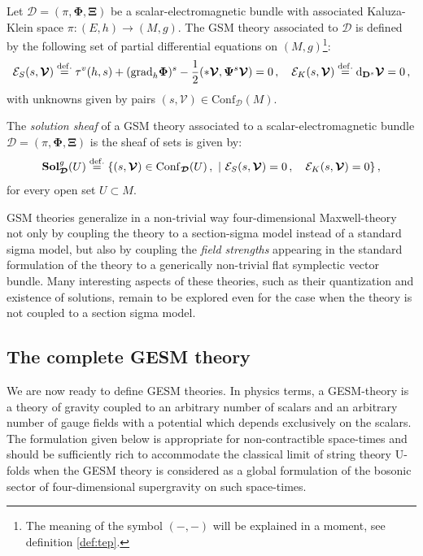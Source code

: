 \documentclass[10pt, cmp, numbook, final, a4paper]{svjour}
\newcommand{\eqdef}{\stackrel{{\rm def.}}{=}}
\def\bD{\mathbb{D}}
\def\dd{\mathrm{d}}
\def\bcD{\boldsymbol{\mathcal{D}}}
\def\bPsi{\mathbf{\Psi}}
\newcommand{\be}{\begin{equation*}}
\newcommand{\ee}{\end{equation*}}
\def\cE{\check{E}}
\def\bXi{{\boldsymbol{\Xi}}}
\def\cV{\mathcal{V}}
\def\cE{\mathcal{E}}
\def\bPhi{\mathbf{\Phi}}
\def\bSol{\mathbf{Sol}}
\def\grad{\mathrm{grad}}
\def\bD{\mathbf{D}}
\def\Conf{\mathrm{Conf}}
\def\bD{\mathbf{D}}
\def\bcV{\boldsymbol{\cV}}
\begin{document}
\begin{definition}
Let $\bcD = (\pi,\bPhi,\bXi)$ be a scalar-electromagnetic bundle with
associated Kaluza-Klein space $\pi\colon (E,h)\to (M,g)$. The
GSM theory associated to $\bcD$ is defined by the following set of
partial differential equations on $(M,g)$\footnote{The meaning of the
symbol $(-,-)$ will be explained in a moment, see definition \ref{def:tep}.}:
\begin{equation*}
\cE_{S}(s,\bcV) \eqdef \tau^{v}(h,s) + (\grad_{h} \bPhi)^{s}- \frac{1}{2} (\ast \bcV , \bPsi^s\bcV) = 0\, , \quad \cE_{K}(s,\bcV)\eqdef \dd_{\bD^s} \bcV=0\, ,
\end{equation*}
with unknowns given by pairs $(s,\bcV)\in \Conf_{\bcD}(M)$.
\end{definition}

\begin{definition}
The {\em solution sheaf} of a GSM theory associated to a
scalar-electromagnetic bundle $\bcD = (\pi,\bPhi,\bXi)$ is the sheaf
of sets is given by:
\be
\bSol^g_{\bcD}(U)\eqdef \{(s,\bcV)\in \Conf_{\bcD}(U)\, , \,\, |\,\, \cE_{S}(s,\bcV) = 0\, , \quad  \cE_{K}(s,\bcV) = 0\}\, ,
\ee
for every open set $U\subset M$.
\end{definition}

\noindent
GSM theories generalize in a non-trivial way four-dimensional
Maxwell-theory not only by coupling the theory to a section-sigma model
instead of a standard sigma model, but also by coupling
the \emph{field strengths} appearing in the standard formulation of
the theory to a generically non-trivial flat symplectic vector
bundle. Many interesting aspects of these theories, such as their
quantization and existence of solutions, remain to be explored
even for the case when the theory is not coupled to a section sigma
model. 

\subsection{The complete GESM theory}
\label{sec:completetheoryII}

We are now ready to define GESM theories. In physics terms, a
GESM-theory is a theory of gravity coupled to an arbitrary number of
scalars and an arbitrary number of gauge fields with a potential which
depends exclusively on the scalars.  The formulation given below is
appropriate for non-contractible space-times and should be sufficiently
rich to accommodate the classical limit of string theory U-folds when
the GESM theory is considered as a global formulation of the bosonic
sector of four-dimensional supergravity on such space-times.
\end{document}
